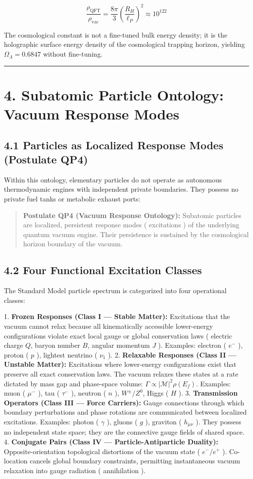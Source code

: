 \documentclass[11pt,a4paper]{article}
\theoremstyle{definition}\newtheorem{definition}{Definition}
\theoremstyle{remark}\newtheorem{remark}{Remark}
\begin{document}
\begin{equation}
\frac{\rho_{\text{QFT}}}{\rho_{\text{vac}}} = \frac{8\pi}{3} \left( \frac{R_H}{\ell_P} \right)^2 \approx 10^{122}
\end{equation}


The cosmological constant is not a fine-tuned bulk energy density; it is the holographic surface energy density of the cosmological trapping horizon, yielding $\Omega_\Lambda = 0.6847$ without fine-tuning.

\noindent\rule{\linewidth}{0.4pt}
\section{4. Subatomic Particle Ontology: Vacuum Response Modes}
\subsection{4.1 Particles as Localized Response Modes (Postulate QP4)}

Within this ontology, elementary particles do not operate as autonomous thermodynamic engines with independent private boundaries. They possess no private fuel tanks or metabolic exhaust ports:

\begin{quote}\textbf{Postulate QP4 (Vacuum Response Ontology):} Subatomic particles are localized, persistent response modes ( excitations ) of the underlying quantum vacuum engine. Their persistence is sustained by the cosmological horizon boundary of the vacuum.\end{quote}
\subsection{4.2 Four Functional Excitation Classes}

The Standard Model particle spectrum is categorized into four operational classes:

1. \textbf{Frozen Responses (Class I — Stable Matter):} Excitations that the vacuum cannot relax because all kinematically accessible lower-energy configurations violate exact local gauge or global conservation laws ( electric charge $Q$, baryon number $B$, angular momentum $J$ ). Examples: electron ( $e^-$ ), proton ( $p$ ), lightest neutrino ( $\nu_1$ ).
2. \textbf{Relaxable Responses (Class II — Unstable Matter):} Excitations where lower-energy configurations exist that preserve all exact conservation laws. The vacuum relaxes these states at a rate dictated by mass gap and phase-space volume: $\Gamma \propto |\mathcal{M}|^2 \rho(E_f)$. Examples: muon ( $\mu^-$ ), tau ( $\tau^-$ ), neutron ( $n$ ), $W^\pm / Z^0$, Higgs ( $H$ ).
3. \textbf{Transmission Operators (Class III — Force Carriers):} Gauge connections through which boundary perturbations and phase rotations are communicated between localized excitations. Examples: photon ( $\gamma$ ), gluons ( $g$ ), graviton ( $h_{\mu\nu}$ ). They possess no independent state space; they are the connective gauge fields of shared space.
4. \textbf{Conjugate Pairs (Class IV — Particle-Antiparticle Duality):} Opposite-orientation topological distortions of the vacuum state ( $e^- / e^+$ ). Co-location cancels global boundary constraints, permitting instantaneous vacuum relaxation into gauge radiation ( annihilation ).
\end{document}
